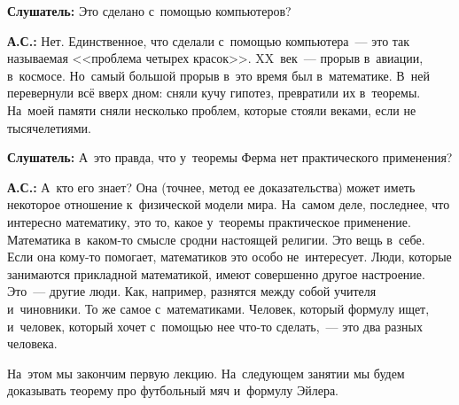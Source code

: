 \textbf{Слушатель:} Это сделано с~помощью компьютеров?

\textbf{А.С.:} Нет. Единственное, что сделали с~помощью компьютера~--- это так называемая
<<проблема четырех красок>>. XX~век~--- прорыв в~авиации, в~космосе. Но~самый большой прорыв в~это
время был в~математике. В~ней перевернули всё вверх дном: сняли кучу гипотез, превратили их
в~теоремы. На~моей памяти сняли несколько проблем, которые стояли веками, если не тысячелетиями.

\textbf{Слушатель:} А~это правда, что у~теоремы Ферма нет практического применения?

\textbf{А.С.:} А~кто его знает? Она (точнее, метод ее доказательства) может иметь некоторое отношение к~физической модели мира. На~самом
деле, последнее, что интересно математику, это то, какое у~теоремы практическое применение.
Математика в~каком-то смысле сродни настоящей религии. Это вещь в~себе. Если она кому-то
помогает, математиков это особо не~интересует.
 Люди, которые занимаются прикладной математикой, имеют
совершенно другое настроение. Это~--- другие люди. Как, например, разнятся между собой учителя
и~чиновники. То же самое с~математиками. Человек, который формулу ищет, и~человек, который хочет
с~помощью нее что-то сделать,~--- это два разных человека.

На~этом мы закончим первую лекцию. На~следующем занятии мы будем доказывать теорему про футбольный
мяч и~формулу Эйлера.

\endinput